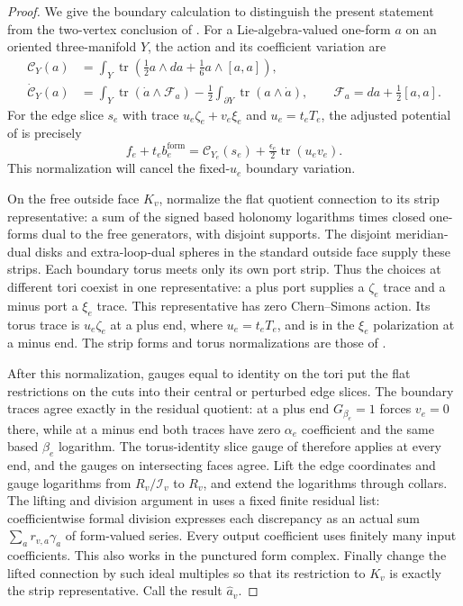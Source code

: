 \begin{proof}
We give the boundary calculation to distinguish the present statement
from the two-vertex conclusion of \cite[Proposition~6.1]{MT}.
For a Lie-algebra-valued one-form $a$ on an oriented three-manifold
$Y$, the action and its coefficient variation are
\begin{equation}
\label{for:action-convention}
 \begin{split}
 \mathcal C_Y(a)&=\int_Y\operatorname{tr}
       \left(\tfrac12a\wedge da+\tfrac16a\wedge[a,a]\right),\\
 \dot{\mathcal C}_Y(a)&=\int_Y\operatorname{tr}
       (\dot a\wedge\mathcal F_a)
       -\tfrac12\int_{\partial Y}\operatorname{tr}(a\wedge\dot a),
 \qquad \mathcal F_a=da+\tfrac12[a,a].
 \end{split}
\end{equation}
For the edge slice $s_e$ with trace $u_e\zeta_e+v_e\xi_e$ and
$u_e=t_eT_e$, the adjusted potential of
\cite[Proposition~4.5]{MT} is precisely
\[
 f_e+t_eb_e^{\mathrm{form}}
   =\mathcal C_{Y_e}(s_e)
          +\tfrac{\epsilon_e}{2}\operatorname{tr}(u_ev_e).
\]
This normalization will cancel the fixed-$u_e$ boundary variation.

On the free outside face $K_v$, normalize the flat quotient connection to
its strip representative: a sum of the signed based holonomy logarithms
times closed one-forms dual to the free generators, with disjoint supports.  The
disjoint meridian-dual disks and extra-loop-dual spheres in the standard
outside face supply these strips.  Each boundary torus meets only its
own port strip.  Thus the choices at different tori coexist in one
representative: a plus port supplies a $\zeta_e$ trace and a minus
port a $\xi_e$ trace.  This representative has zero Chern--Simons
action.  Its torus trace is
$u_e\zeta_e$ at a plus end, where $u_e=t_eT_e$, and is in the
$\xi_e$ polarization at a minus end.  The strip forms and torus
normalizations are those of \cite[Sections~4 and~6.3]{MT}.

After this normalization, gauges equal to identity on the tori put
the flat restrictions on the cuts into their central or perturbed edge
slices.  The boundary traces agree exactly in the residual quotient:
at a plus end $G_{\beta_e}=1$ forces $v_e=0$ there, while at a minus
end both traces have zero $\alpha_e$ coefficient and the same based
$\beta_e$ logarithm.  The torus-identity slice gauge of
\cite[Lemma~4.4]{MT} therefore applies at every end, and the gauges on
intersecting faces agree.  Lift the edge
coordinates and gauge logarithms from $R_v/\mathcal I_v$ to $R_v$,
and extend the logarithms through collars.  The lifting and division
argument in \cite[Section~6.3]{MT} uses a fixed finite residual list:
coefficientwise formal division expresses each discrepancy as an
actual sum $\sum_a r_{v,a}\gamma_a$ of form-valued series.  Every
output coefficient uses finitely many input coefficients.  This also
works in the punctured form complex.  Finally change the lifted
connection by such ideal multiples so that its restriction to $K_v$
is exactly the strip representative.  Call the result
$\widehat a_v$.


\end{proof}
